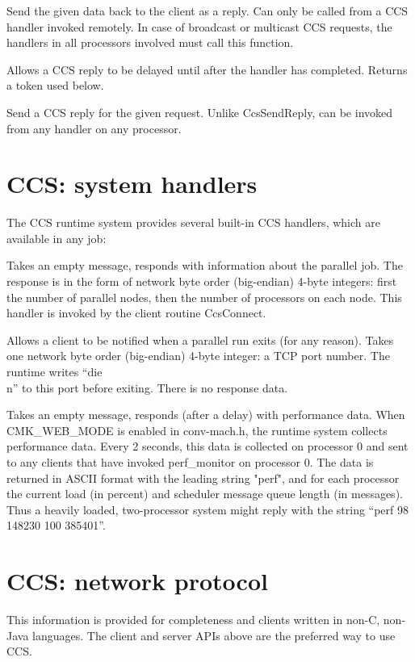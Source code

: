 Send the given data back to the client as a reply.
Can only be called from a CCS handler invoked remotely.
In case of broadcast or multicast CCS requests, the handlers in
all processors involved must call this function.

Allows a CCS reply to be delayed until after the handler
has completed.  Returns a token used below.

Send a CCS reply for the given request.  Unlike
CcsSendReply, can be invoked from any handler on any processor.


\section{CCS: system handlers}
The CCS runtime system provides several built-in CCS handlers,
which are available in any \converse{} job:

Takes an empty message, responds with information about the parallel
job.  The response is in the form of network byte order (big-endian) 4-byte 
integers: first the number of parallel nodes, then the number of processors
on each node.  This handler is invoked by the client routine CcsConnect.

Allows a client to be notified when a parallel run exits (for any reason).
Takes one network byte order (big-endian) 4-byte integer: a TCP port
number. The runtime writes ``die\\n'' to this port before exiting.
There is no response data.

Takes an empty message, responds (after a delay) with performance data.
When CMK\_WEB\_MODE is enabled in conv-mach.h, the runtime system collects
performance data.  Every 2 seconds, this data is collected on processor
0 and sent to any clients that have invoked perf\_monitor on processor 0.
The data is returned in ASCII format with the leading string "perf", 
and for each processor the current load (in percent) and scheduler message
queue length (in messages).  Thus a heavily loaded, two-processor system
might reply with the string ``perf 98 148230 100 385401''.


\section{CCS: network protocol}
This information is provided for completeness and clients written
in non-C, non-Java languages.  The client and server APIs above are
the preferred way to use CCS.

